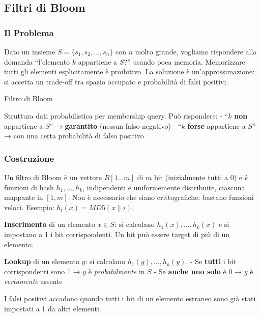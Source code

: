 \documentclass[
  italian,
  openany]{book}
\begin{document}
\subsection{Filtri di Bloom}\label{filtri-di-bloom}

\subsubsection{Il Problema}\label{il-problema}

Dato un insieme \(S = \{s_1, s_2, \ldots, s_n\}\) con \(n\) molto
grande, vogliamo rispondere alla domanda ``l'elemento \(k\) appartiene a
\(S\)?'' usando poca memoria. Memorizzare tutti gli elementi
esplicitamente è proibitivo. La soluzione è un'approssimazione: si
accetta un trade-off tra spazio occupato e probabilità di falsi
positivi.

\begin{calloutdefinition}{Filtro di Bloom}

Struttura dati probabilistica per membership query. Può rispondere: -
``\(k\) \textbf{non} appartiene a \(S\)'' → \textbf{garantito} (nessun
falso negativo) - ``\(k\) \textbf{forse} appartiene a \(S\)'' → con una
certa probabilità di falso positivo

\end{calloutdefinition}

\subsubsection{Costruzione}\label{costruzione}

Un filtro di Bloom è un vettore \(B[1 \ldots m]\) di \(m\) bit
(inizialmente tutti a 0) e \(k\) funzioni di hash \(h_1, \ldots, h_k\),
indipendenti e uniformemente distribuite, ciascuna mappante in
\([1, m]\). Non è necessario che siano crittografiche: bastano funzioni
veloci. Esempio: \(h_i(x) = MD5(x \| i)\).

\textbf{Inserimento} di un elemento \(x \in S\): si calcolano
\(h_1(x), \ldots, h_k(x)\) e si impostano a 1 i bit corrispondenti. Un
bit può essere target di più di un elemento.

\textbf{Lookup} di un elemento \(y\): si calcolano
\(h_1(y), \ldots, h_k(y)\). - Se \textbf{tutti} i bit corrispondenti
sono 1 → \(y\) è \emph{probabilmente} in \(S\) - Se \textbf{anche uno
solo} è 0 → \(y\) è \emph{certamente} assente

I falsi positivi accadono quando tutti i bit di un elemento estraneo
sono già stati impostati a 1 da altri elementi.
\end{document}
